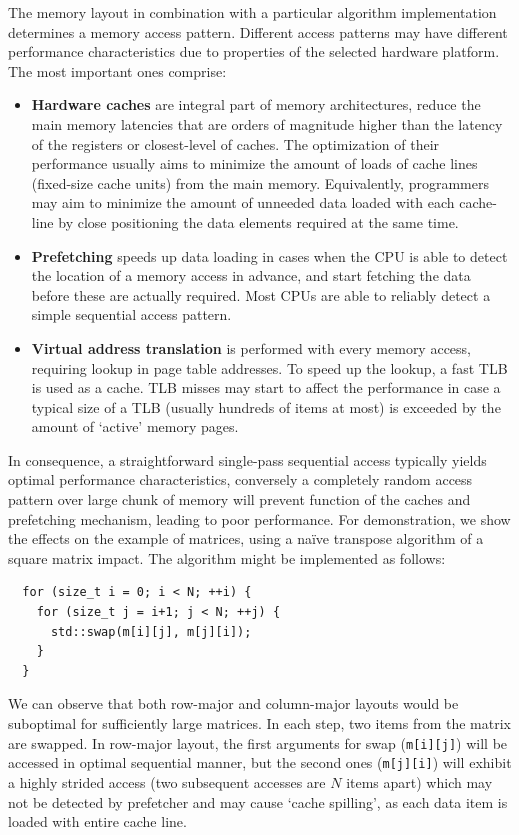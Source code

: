 The memory layout in combination with a particular algorithm implementation determines a memory access pattern. Different access patterns may have different performance characteristics due to properties of the selected hardware platform. The most important ones comprise:

\begin{itemize}
    \item \textbf{Hardware caches} are integral part of memory architectures, reduce the main memory latencies that are orders of magnitude higher than the latency of the registers or closest-level of caches. The optimization of their performance usually aims to minimize the amount of loads of cache lines (fixed-size cache units) from the main memory. Equivalently, programmers may aim to minimize the amount of unneeded data loaded with each cache-line by close positioning the data elements required at the same time.
    \item \textbf{Prefetching} speeds up data loading in cases when the CPU is able to detect the location of a memory access in advance, and start fetching the data before these are actually required. Most CPUs are able to reliably detect a simple sequential access pattern.
    \item \textbf{Virtual address translation} is performed with every memory access, requiring lookup in page table addresses. To speed up the lookup, a fast TLB is used as a cache. TLB misses may start to affect the performance in case a typical size of a TLB (usually hundreds of items at most) is exceeded by the amount of `active' memory pages.
\end{itemize}

In consequence, a straightforward single-pass sequential access typically yields optimal performance characteristics, conversely a completely random access pattern over large chunk of memory will prevent function of the caches and prefetching mechanism, leading to poor performance. For demonstration, we show the effects on the example of matrices, using a na\"{i}ve transpose algorithm of a square matrix impact. The algorithm might be implemented as follows:

\begin{verbatim}
  for (size_t i = 0; i < N; ++i) {
    for (size_t j = i+1; j < N; ++j) {
      std::swap(m[i][j], m[j][i]);
    }
  }
\end{verbatim}

We can observe that both row-major and column-major layouts would be suboptimal for sufficiently large matrices. In each step, two items from the matrix are swapped. In row-major layout, the first arguments for swap (\texttt{m[i][j]}) will be accessed in optimal sequential manner, but the second ones (\texttt{m[j][i]}) will exhibit a highly strided access (two subsequent accesses are $N$ items apart) which may not be detected by prefetcher and may cause `cache spilling', as each data item is loaded with entire cache line.

